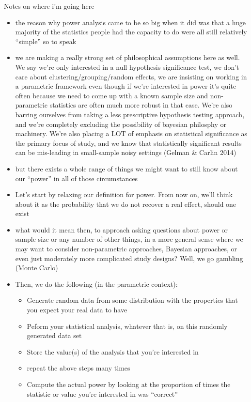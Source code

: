 \documentclass[
  ignorenonframetext,
  aspectratio=169,
]{beamer}
\providecommand{\tightlist}{%
  \setlength{\itemsep}{0pt}\setlength{\parskip}{0pt}}\usepackage{longtable,booktabs,array}
\begin{document}
\begin{frame}{Notes on where i'm going here}
\label{notes-on-where-im-going-here}
\begin{itemize}
\tightlist
\item
  the reason why power analysis came to be so big when it did was that a
  huge majority of the statistics people had the capacity to do were all
  still relatively ``simple'' so to speak
\item
  we are making a really strong set of philosophical assumptions here as
  well. We say we're only interested in a null hypothesis significance
  test, we don't care about clustering/grouping/random effects, we are
  insisting on working in a parametric framework even though if we're
  interested in power it's quite often because we need to come up with a
  known sample size and non-parametric statistics are often much more
  robust in that case. We're also barring ourselves from taking a less
  prescriptive hypothesis testing approach, and we're completely
  excluding the possibility of bayesian philosphy or machinery. We're
  also placing a LOT of emphasis on statistical significance as the
  primary focus of study, and we know that statistically significant
  results can be mis-leading in small-sample noisy settings (Gelman \&
  Carlin 2014)
\item
  but there exists a whole range of things we might want to still know
  about our ``power'' in all of those circumstances
\item
  Let's start by relaxing our definition for power. From now on, we'll
  think about it as the probability that we do not recover a real
  effect, should one exist
\item
  what would it mean then, to approach asking questions about power or
  sample size or any number of other things, in a more general sense
  where we may want to consider non-parametric approaches, Bayesian
  approaches, or even just moderately more complicated study designs?
  Well, we go gambling (Monte Carlo)
\item
  Then, we do the following (in the parametric context):

  \begin{itemize}
  \tightlist
  \item
    Generate random data from some distribution with the properties that
    you expect your real data to have
  \item
    Peform your statistical analysis, whatever that is, on this randomly
    generated data set
  \item
    Store the value(s) of the analysis that you're interested in
  \item
    repeat the above steps many times
  \item
    Compute the actual power by looking at the proportion of times the
    statistic or value you're interested in was ``correct''
  \end{itemize}
\end{itemize}
\end{frame}
\end{document}
